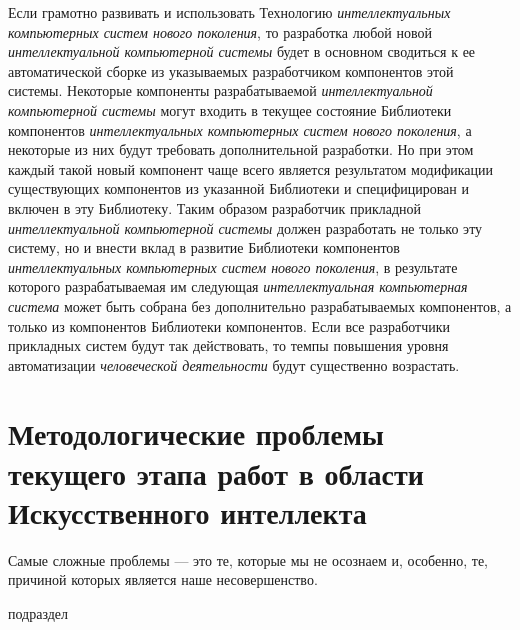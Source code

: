 \begin{textitemize}
\begin{textitemize}
		Если грамотно развивать и использовать Технологию \textit{интеллектуальных компьютерных систем нового поколения}, то разработка любой новой \textit{интеллектуальной компьютерной системы} будет в основном сводиться к ее автоматической сборке из указываемых разработчиком компонентов этой системы. Некоторые компоненты разрабатываемой \textit{интеллектуальной компьютерной системы} могут входить в текущее состояние Библиотеки компонентов \textit{интеллектуальных компьютерных систем нового поколения}, а некоторые из них будут требовать дополнительной разработки. Но при этом каждый такой новый компонент чаще всего является результатом модификации существующих компонентов из  указанной Библиотеки и  специфицирован и включен в эту Библиотеку. Таким образом разработчик прикладной \textit{интеллектуальной компьютерной системы} должен разработать не только эту систему, но и внести вклад в развитие Библиотеки компонентов \textit{интеллектуальных компьютерных систем нового поколения}, в результате которого разрабатываемая им следующая \textit{интеллектуальная компьютерная система} может быть собрана без дополнительно разрабатываемых компонентов, а только из компонентов Библиотеки компонентов. Если все разработчики прикладных систем будут так действовать, то темпы повышения уровня автоматизации \textit{человеческой деятельности} будут существенно возрастать.
	\end{textitemize}
\end{textitemize}

\section*{Методологические проблемы текущего этапа работ в области Искусственного интеллекта}
\label{concl_methodological_problems_current_stage_work_field_AI}

\begin{SCn}
	{Самые сложные проблемы --- это те, которые мы не осознаем и, особенно, те, причиной которых является наше несовершенство.
	}
	
	\begin{scnrelfromlist}{подраздел}
	\end{scnrelfromlist}
\end{SCn}


